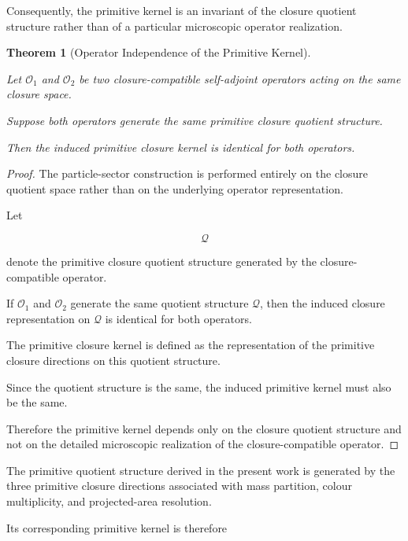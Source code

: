 \documentclass[11pt]{article}
\newtheorem{theorem}{Theorem}[section]
\theoremstyle{definition}
\theoremstyle{remark}
\begin{document}
Consequently, the primitive kernel is an invariant of the
closure quotient structure rather than of a particular
microscopic operator realization.

\begin{theorem}[Operator Independence of the Primitive Kernel]
\label{thm:operator_independence_kernel}

Let \(\mathcal O_1\) and \(\mathcal O_2\) be two
closure-compatible self-adjoint operators acting on the same
closure space.

Suppose both operators generate the same primitive closure
quotient structure.

Then the induced primitive closure kernel is identical for both
operators.

\end{theorem}

\begin{proof}

The particle-sector construction is performed entirely on the
closure quotient space rather than on the underlying operator
representation.

Let

\begin{equation}
\mathcal Q
\end{equation}

denote the primitive closure quotient structure generated by
the closure-compatible operator.

If \(\mathcal O_1\) and \(\mathcal O_2\) generate the same
quotient structure \(\mathcal Q\), then the induced closure
representation on \(\mathcal Q\) is identical for both
operators.

The primitive closure kernel is defined as the representation of
the primitive closure directions on this quotient structure.

Since the quotient structure is the same, the induced primitive
kernel must also be the same.

Therefore the primitive kernel depends only on the closure
quotient structure and not on the detailed microscopic
realization of the closure-compatible operator.

\end{proof}

The primitive quotient structure derived in the present work is
generated by the three primitive closure directions associated
with mass partition, colour multiplicity, and projected-area
resolution.

Its corresponding primitive kernel is therefore
\end{document}
